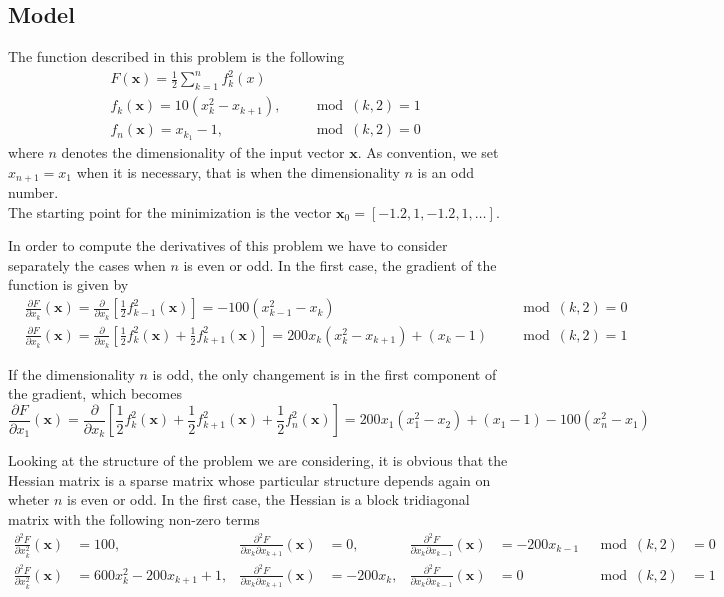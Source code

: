 \subsection*{Model}
The function described in this problem is the following
\begin{equation*}
    \begin{aligned}
    & F(\mathbf{x}) = \frac{1}{2} \sum_{k=1}^{n} f_k^2(x) \\
    & f_k(\mathbf{x}) = 10 \left(x_k^2 - x_{k+1}\right), \quad  & \mod (k,2) = 1\\   
    & f_n(\mathbf{x}) = x_{k_1} -1, \quad & \mod(k,2) = 0
    \end{aligned}
\end{equation*}
where $n$ denotes the dimensionality of the input vector $\mathbf{x}$. As convention, we set $x_{n+1} = x_1$ when it is necessary, that is when the dimensionality $n$ is an odd number.
\\ The starting point for the minimization is the vector $\mathbf{x}_0 = [-1.2, 1, -1.2, 1, \ldots]$.

In order to compute the derivatives of this problem we have to consider separately the cases when $n$ is even or odd. In the first case, the gradient of the function is given by
\begin{align*}
    &\frac{\partial F}{\partial x_k} (\mathbf{x}) = \frac{\partial}{\partial x_k} \left[\frac{1}{2} f_{k-1}^2(\mathbf{x})\right] = - 100 (x_{k-1}^2 - x_k) \quad & \mod(k,2) = 0 \\
    & \frac{\partial F}{\partial x_k} (\mathbf{x}) = \frac{\partial}{\partial x_k} \left[\frac{1}{2} f_{k}^2(\mathbf{x}) + \frac{1}{2} f_{k+1}^2(\mathbf{x})\right] = 200x_k (x_k^2 - x_{k+1}) + (x_k -1)\quad & \mod(k,2) = 1
\end{align*}

If the dimensionality $n$ is odd, the only changement is in the first component of the gradient, which becomes
$$ \frac{\partial F}{\partial x_1} (\mathbf{x})  = \frac{\partial}{\partial x_k} \left[\frac{1}{2} f_{k}^2(\mathbf{x}) + \frac{1}{2} f_{k+1}^2(\mathbf{x}) + \frac{1}{2}f_n^2(\mathbf{x}) \right] = 200x_1 (x_1^2 - x_{2}) + (x_1 -1)  - 100(x_n^2 - x_1)$$

Looking at the structure of the problem we are considering, it is obvious that the Hessian matrix is a sparse matrix whose particular structure depends again on wheter $n$ is even or odd. In the first case, the Hessian is a block tridiagonal matrix with the following non-zero terms
\begin{align*}
    \frac{\partial^2 F}{\partial x_k^2} (\mathbf{x}) &= 100, & \frac{\partial^2 F}{\partial x_k \partial x_{k+1}} (\mathbf{x}) &= 0, & \frac{\partial^2 F}{\partial x_k \partial x_{k-1}} (\mathbf{x}) &= -200x_{k-1} & \mod(k,2) &= 0 \\
    \frac{\partial^2 F}{\partial x_k^2} (\mathbf{x}) &= 600x_k^2 - 200x_{k+1} + 1, & \frac{\partial^2 F}{\partial x_k \partial x_{k+1}} (\mathbf{x}) &= -200x_k, & \frac{\partial^2 F}{\partial x_k \partial x_{k-1}} (\mathbf{x}) &= 0 & \mod(k,2) &= 1 \\
\end{align*}

